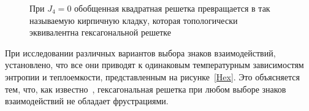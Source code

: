 \documentclass[utf8,12pt]{jetp}
\begin{document}
\begin{figure}[h]
	\caption{При $J_4 = 0$ обобщенная квадратная решетка превращается в так называемую кирпичную кладку, которая топологически эквивалентна гексагональной решетке}
	\label{hexTranf}
\end{figure}

При исследовании различных вариантов выбора знаков взаимодействий, установлено, что все они приводят к одинаковым температурным зависимостям энтропии и теплоемкости, представленным на рисунке~\ref{Hex}. Это объясняется тем, что, как известно~\cite{houtapell1950}, гексагональная решетка при любом выборе знаков взаимодействий не обладает фрустрациями.
\end{document}
